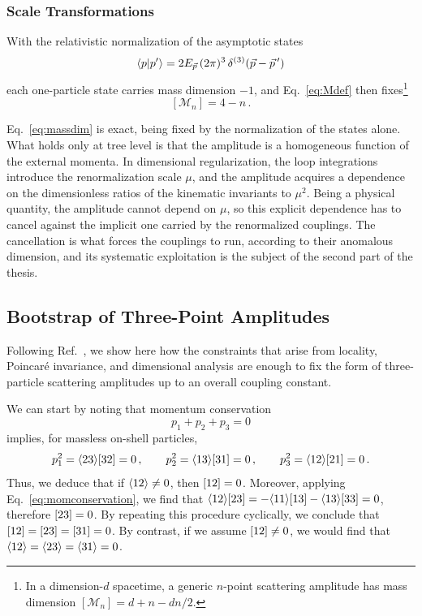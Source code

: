 \subsubsection{Scale Transformations}

With the relativistic normalization of the asymptotic states
\begin{equation}
    \braket{p}{p'} = 2E_{\vec p}\,(2\pi)^3\,\delta^{(3)}(\vec p - \vec p\,')
\end{equation}
each one-particle state carries mass dimension $-1$, and Eq.~\eqref{eq:Mdef} then fixes\footnote{In a dimension-$d$ spacetime, a generic $n$-point scattering amplitude has mass dimension $[\mathcal M_n] = d+n-dn/2$.}
\begin{equation}\label{eq:massdim}
    [\mathcal M_n] = 4-n\,.
\end{equation}

Eq.~\eqref{eq:massdim} is exact, being fixed by the normalization of the states alone. What
holds only at tree level is that the amplitude is a homogeneous function of the external momenta.
In dimensional regularization, the loop integrations introduce the renormalization scale $\mu$, and
the amplitude acquires a dependence on the dimensionless ratios of the kinematic invariants to
$\mu^2$. Being a physical quantity, the amplitude cannot depend on $\mu$, so this explicit
dependence has to cancel against the implicit one carried by the renormalized couplings. The
cancellation is what forces the couplings to run, according to their anomalous dimension, and its systematic exploitation is the subject of
the second part of the thesis.


\subsection{Bootstrap of Three-Point Amplitudes}
\label{sec:3pointamplitudes}

Following Ref.~\cite{Benincasa:2007xk}, we show here how the constraints that arise from locality, Poincaré invariance, and dimensional analysis are enough to fix the form of three-particle scattering amplitudes up to an overall coupling constant.

We can start by noting that momentum conservation
\begin{equation}
    p_1+p_2+p_3=0
\end{equation}
implies, for massless on-shell particles,
\begin{equation}
    p_1^2=\langle 2 3 \rangle\lbrack 3 2 \rbrack=0\,,\qquad
    p_2^2=\langle 1 3 \rangle\lbrack 3 1 \rbrack=0\,,\qquad
    p_3^2=\langle 1 2 \rangle\lbrack 2 1 \rbrack=0\,.
\end{equation}
Thus, we deduce that if $\langle 1 2 \rangle\neq 0$, then $\lbrack 1 2 \rbrack=0$. Moreover, applying Eq.~\eqref{eq:momconservation}, we find that $\langle 1 2 \rangle\lbrack 2 3 \rbrack = -\langle 1 1 \rangle\lbrack 1 3 \rbrack-\langle 1 3 \rangle\lbrack 3 3 \rbrack = 0$, therefore $\lbrack 2 3 \rbrack=0$.
By repeating this procedure cyclically, we conclude that $\lbrack 1 2 \rbrack=\lbrack 2 3 \rbrack=\lbrack 3 1 \rbrack=0$. 
By contrast, if we assume $\lbrack 1 2 \rbrack\neq 0$, we would find that $\langle 1 2 \rangle=\langle 2 3 \rangle=\langle 3 1 \rangle=0$.

